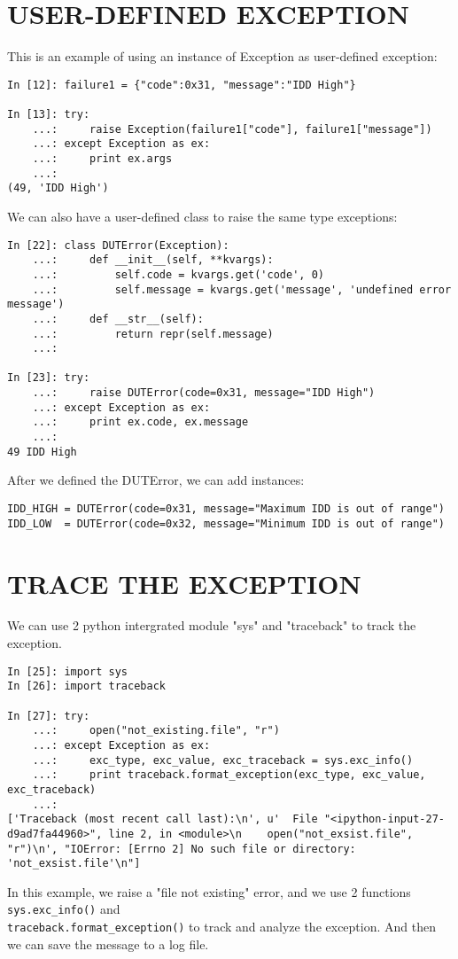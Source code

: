 \newpage
\section{USER-DEFINED EXCEPTION}
This is an example of using an instance of Exception as user-defined exception:
\begin{lstlisting}
In [12]: failure1 = {"code":0x31, "message":"IDD High"}

In [13]: try:
    ...:     raise Exception(failure1["code"], failure1["message"])
    ...: except Exception as ex:
    ...:     print ex.args
    ...: 
(49, 'IDD High')
\end{lstlisting}
We can also have a user-defined class to raise the same type exceptions:
\begin{lstlisting}
In [22]: class DUTError(Exception):
    ...:     def __init__(self, **kvargs):
    ...:         self.code = kvargs.get('code', 0)
    ...:         self.message = kvargs.get('message', 'undefined error message')
    ...:     def __str__(self):
    ...:         return repr(self.message)
    ...: 

In [23]: try:
    ...:     raise DUTError(code=0x31, message="IDD High")
    ...: except Exception as ex:
    ...:     print ex.code, ex.message
    ...: 
49 IDD High
\end{lstlisting}
After we defined the DUTError, we can add instances:
\begin{lstlisting}
IDD_HIGH = DUTError(code=0x31, message="Maximum IDD is out of range")
IDD_LOW  = DUTError(code=0x32, message="Minimum IDD is out of range")
\end{lstlisting}

\newpage
\section{TRACE THE EXCEPTION}
We can use 2 python intergrated module "sys" and "traceback" to track the exception.
\begin{lstlisting}
In [25]: import sys
In [26]: import traceback

In [27]: try:
    ...:     open("not_existing.file", "r")
    ...: except Exception as ex:
    ...:     exc_type, exc_value, exc_traceback = sys.exc_info()
    ...:     print traceback.format_exception(exc_type, exc_value, exc_traceback)
    ...: 
['Traceback (most recent call last):\n', u'  File "<ipython-input-27-d9ad7fa44960>", line 2, in <module>\n    open("not_exsist.file", "r")\n', "IOError: [Errno 2] No such file or directory: 'not_exsist.file'\n"]
\end{lstlisting}
In this example, we raise a "file not existing" error, and we use 2 functions \verb|sys.exc_info()| and \\ \verb|traceback.format_exception()| to track and analyze the exception.
And then we can save the message to a log file.


